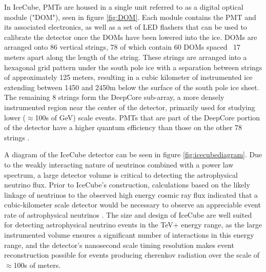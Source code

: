 In IceCube, PMTs are housed in a single unit referred to as a digital optical module ("DOM"), seen in figure \ref{fig:DOM}. Each module contains the PMT and its associated electronics, as well as a set of LED flashers that can be used to calibrate the detector once the DOMs have been lowered into the ice. DOMs are arranged onto 86 vertical strings, 78 of which contain 60 DOMs spaced ~17 meters apart along the length of the string. These strings are arranged into a hexagonal grid pattern under the south pole ice with a separation between strings of approximately 125 meters, resulting in a cubic kilometer of instrumented ice extending between 1450 and 2450m below the surface of the south pole ice sheet. The remaining 8 strings form the DeepCore sub-array, a more densely instrumented region near the center of the detector, primarily used for studying lower ($\approx$100s of GeV) scale events. PMTs that are part of the DeepCore portion of the detector have a higher quantum efficiency than those on the other 78 strings \cite{deepcorepaper}.  

A diagram of the IceCube detector can be seen in figure \ref{fig:icecubediagram}. Due to the weakly interacting nature of neutrinos combined with a power law spectrum, a large detector volume is critical to detecting the astrophysical neutrino flux. Prior to IceCube's construction, calculations based on the likely linkage of neutrinos to the observed high energy cosmic ray flux indicated that a cubic-kilometer scale detector would be necessary to observe an appreciable event rate of astrophysical neutrinos \cite{Halzen_2002}\cite{Waxman_1998}. The size and design of IceCube are well suited for detecting astrophysical neutrino events in the TeV+ energy range, as the large instrumented volume ensures a significant number of interactions in this energy range, and the detector's nanosecond scale timing resolution makes event reconstruction possible for events producing cherenkov radiation over the scale of $\approx$100s of meters. 

